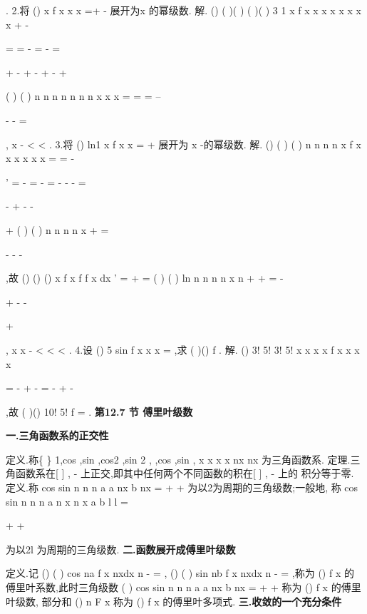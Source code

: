 \sum 
\sum 
\sum 
. 
2.将
()
x
f
x
x
x
=+
-
展开为x 的幂级数. 
解.
()
(
)(
)
(
)(
)
3 1
x
f x
x
x
x
x
x
x
x
+
-


=
=
-
=
-
=


+
-
+
-
+
-
+


(
)
(
)
n
n
n
n
n
n
n
x
x
x
\infty 
\infty 
\infty 
=
=
=
--


-
-
=




\sum 
\sum 
\sum 
,
x
-
<
<
. 
3.将
()
ln1
x
f x
x
=
+
展开为
x -的幂级数. 
解.
()
(
)
(
)
n
n
n
n
x
f
x
x
x
x
x
x
\infty 
\infty 
=
=
-


'
=
-
=
-
\cdots 
=
-
-
-
=


-
+
-
-


+
\sum 
\sum 
(
)
(
)
n
n
n
n
x
\infty 
+
=


-
-
-




\sum 
,故
()
()
()
x
f x
f
f
x dx
'
=
+
=
\int 
(
)
(
)
ln
n
n
n
n
x
n
\infty 
+
+
=
-


+
-
-


+


\sum 
,
x
x
-
<\Leftrightarrow 
<
<
. 
4.设
()
5 sin
f x
x
x
=
,求
(
)()
f
. 
解.
()
3!
5!
3!
5!
x
x
x
x
f x
x
x
x


=
-
+
-
=
-
+
-




\Lambda 
\Lambda ,故
(
)()
10!
5!
f
=
. 
\vspace{6pt}
{\large \bfseries \textcolor{lyred}{第12.7 节 傅里叶级数}}

\vspace{4pt}
{\bfseries \textcolor{lyred}{一.三角函数系的正交性}}

\textcolor{lyred}{定义}.称\{
\}
1,cos ,sin ,cos2 ,sin 2 ,
,cos
,sin
,
x
x
x
x
nx
nx
\Lambda 
\Lambda 为\textcolor{lyred}{三角函数系}.\textcolor{lyred}{ }
\textcolor{lyred}{定理}.三角函数系在[
]
,
\pi \pi 
-
上\textcolor{lyred}{正交},即其中任何两个不同函数的积在[
]
,
\pi \pi 
-
上的 
积分等于零. 
\textcolor{lyred}{定义}.称
cos
sin
n
n
n
a
a
nx
b
nx
\infty 
=
+
+
\sum 
为以2\pi 为周期的\textcolor{lyred}{三角级数};一般地, 
称
cos
sin
n
n
n
a
n x
n x
a
b
l
l
\pi 
\pi 
\infty 
=


+
+




\sum 
为以2l 为周期的\textcolor{lyred}{三角级数}. 
\vspace{4pt}
{\bfseries \textcolor{lyred}{二.函数展开成傅里叶级数}}

\textcolor{lyred}{定义}.记
()
(
)
cos
na
f x
nxdx n
\pi 
\pi 
\pi -
=
\ge 
\int 
,
()
(
)
sin
nb
f x
nxdx n
\pi 
\pi 
\pi -
=
\ge 
\int 
,称为
()
f x 的 
\textcolor{lyred}{傅里叶系数},此时三角级数
(
)
cos
sin
n
n
n
a
a
nx
b
nx
\infty 
=
+
+
\sum 
称为
()
f x 的\textcolor{lyred}{傅里叶级数}, 
部分和
()
n
F
x 称为
()
f x 的\textcolor{lyred}{傅里叶多项式}. 
\vspace{4pt}
{\bfseries \textcolor{lyred}{三.收敛的一个充分条件}}

